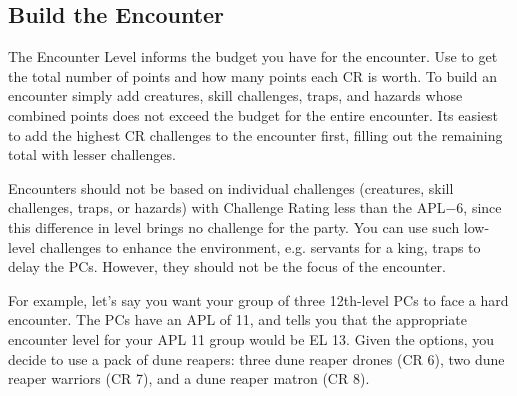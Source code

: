 
\subsection{Build the Encounter}
The Encounter Level informs the budget you have for the encounter. Use  to get the total number of points and how many points each CR is worth. To build an encounter simply add creatures, skill challenges, traps, and hazards whose combined points does not exceed the budget for the entire encounter. Its easiest to add the highest CR challenges to the encounter first, filling out the remaining total with lesser challenges.

Encounters should not be based on individual challenges (creatures, skill challenges, traps, or hazards) with Challenge Rating less than the APL$-6$, since this difference in level brings no challenge for the party. You can use such low-level challenges to enhance the environment, e.g. servants for a king, traps to delay the PCs. However, they should not be the focus of the encounter.



For example, let's say you want your group of three 12th-level PCs to face a hard encounter. The PCs have an APL of 11, and  tells you that the appropriate encounter level for your APL 11 group would be EL 13. Given the options, you decide to use a pack of dune reapers: three dune reaper drones (CR 6), two dune reaper warriors (CR 7), and a dune reaper matron (CR 8). %

